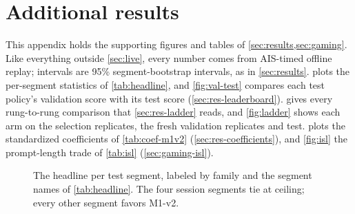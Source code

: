 %

\section{Additional results}
\label{app:results}

This appendix holds the supporting figures and tables of \cref{sec:results,sec:gaming}. Like
everything outside \cref{sec:live}, every number comes from AIS-timed offline replay; intervals are
95\% segment-bootstrap intervals, as in \cref{sec:results}.  plots the
per-segment statistics of \cref{tab:headline}, and \cref{fig:val-test} compares each test policy's
validation score with its test score (\cref{sec:res-leaderboard}).  gives
every rung-to-rung comparison that \cref{sec:res-ladder} reads, and \cref{fig:ladder} shows each arm
on the selection replicates, the fresh validation replicates and test.  plots the
standardized coefficients of \cref{tab:coef-m1v2} (\cref{sec:res-coefficients}), and \cref{fig:isl}
the prompt-length trade of \cref{tab:isl} (\cref{sec:gaming-isl}).

\begin{figure}[tbp]
  \centering
  
  \caption{The headline per test segment, labeled by family and the segment names of
    \cref{tab:headline}. The four session segments tie at ceiling;
    every other segment favors M1-v2.}
  \label{fig:headline}
\end{figure}

